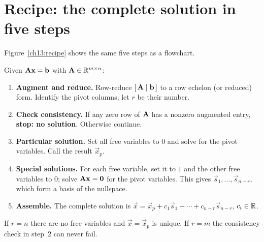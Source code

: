 \section{Recipe: the complete solution in five steps}

Figure~\ref{ch13:recipe} shows the same five steps as a flowchart.

\begin{focusbox}
Given $\mathbf{A}\mathbf{x}=\mathbf{b}$ with $\mathbf{A}\in\mathbb{R}^{m\times n}$:
\begin{enumerate}
  \item \textbf{Augment and reduce.} Row-reduce $[\,\mathbf{A}\mid\mathbf{b}\,]$ to a
    row echelon (or reduced) form. Identify the pivot columns; let $r$ be their number.
  \item \textbf{Check consistency.} If any zero row of $\mathbf{A}$ has a nonzero augmented
    entry, \textbf{stop: no solution}. Otherwise continue.
  \item \textbf{Particular solution.} Set all free variables to $0$ and solve for the pivot
    variables. Call the result $\vec{x}_p$.
  \item \textbf{Special solutions.} For each free variable, set it to $1$ and the other
    free variables to $0$; solve $\mathbf{A}\mathbf{x}=\mathbf{0}$ for the pivot variables. This
    gives $\vec{s}_1,\dots,\vec{s}_{n-r}$, which form a basis of the nullspace.
  \item \textbf{Assemble.} The complete solution is
    $\vec{x}=\vec{x}_p+c_1\vec{s}_1+\cdots+c_{n-r}\vec{s}_{n-r}$, $c_i\in\mathbb{R}$.
\end{enumerate}
If $r=n$ there are no free variables and $\vec{x}=\vec{x}_p$ is unique. If $r=m$ the
consistency check in step~2 can never fail.
\end{focusbox}

